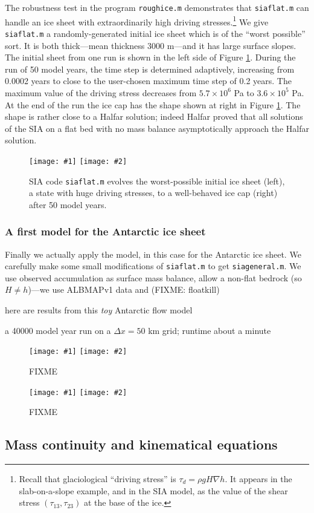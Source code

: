 \documentclass[titlepage,letterpaper,final,12pt]{scrartcl}
\newcommand{\grad}{\nabla}
\newcommand{\twofigsizes}[5]{
\begin{figure}[ht]
\centering
\texttt{[image: \#1]} \quad
\texttt{[image: \#2]}
\caption{#3}
\label{fig:#1}
\end{figure}}
\newcommand{\twofig}[3]{\twofigsizes{#1}{#2}{#3}{2.5in}{2.5in}}
\begin{document}
The robustness test in the program \texttt{roughice.m} demonstrates that \texttt{siaflat.m} can handle an ice sheet with extraordinarily high driving stresses.\footnote{Recall that glaciological ``driving stress'' is $\tau_d = \rho g H \grad h$.  It appears in the slab-on-a-slope example, and in the SIA model, as the value of the shear stress $(\tau_{13},\tau_{23})$ at the base of the ice.}  We give \texttt{siaflat.m} a randomly-generated initial ice sheet which is of the ``worst possible'' sort.  It is both thick---mean thickness 3000 m---and it has large surface slopes.  The initial sheet from one run is shown in the left side of Figure \ref{fig:roughinitial}.  During the run of 50 model years, the time step is determined adaptively, increasing from 0.0002 years to close to the user-chosen maximum time step of 0.2 years.  The maximum value of the driving stress decreases from $5.7\times 10^6$ Pa to $3.6\times 10^5$ Pa.  At the end of the run the ice cap has the shape shown at right in Figure \ref{fig:roughinitial}.  The shape is rather close to a Halfar solution; indeed Halfar proved that all solutions of the SIA on a flat bed with no mass balance asymptotically approach the Halfar solution.

\twofig{roughinitial}{roughfinal}{SIA code \texttt{siaflat.m} evolves the worst-possible initial ice sheet (left), a state with huge driving stresses, to a well-behaved ice cap (right) after 50 model years.}

\subsubsection*{A first model for the Antarctic ice sheet}  Finally we actually apply the model, in this case for the Antarctic ice sheet.  We carefully make some small modifications of \texttt{siaflat.m} to get \texttt{siageneral.m}.  We use observed accumulation as surface mass balance, allow a non-flat bedrock (so $H\ne h$)---we use ALBMAPv1 data \cite{LeBrocqetal2010} and (FIXME: floatkill)

here are results from this \emph{toy} Antarctic flow model

a 40000 model year run on a $\Delta x=50$ km grid; runtime about a minute

\twofigsizes{antinitial}{antfinal}{FIXME}{2.55in}{3.2in}

\twofig{antvol}{antvol25km}{FIXME}


\subsection{Mass continuity and kinematical equations}
\end{document}
